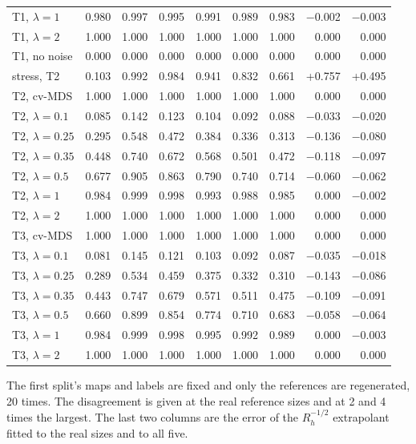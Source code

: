 \documentclass[11pt]{article}
\newcommand{\tablenote}[1]{\par\smallskip\noindent
  \begin{minipage}{\linewidth}\footnotesize\setlength{\parindent}{0pt}#1\end{minipage}}
\begin{document}
\begin{table}[!htb]
\begin{tabular}{lrrrrrrrr}
\quad T1, $\lambda=1$ & 0.980 & 0.997 & 0.995 & 0.991 & 0.989 & 0.983 & $-$0.002 & $-$0.003 \\
\quad T1, $\lambda=2$ & 1.000 & 1.000 & 1.000 & 1.000 & 1.000 & 1.000 & 0.000 & 0.000 \\
\quad T1, no noise & 0.000 & 0.000 & 0.000 & 0.000 & 0.000 & 0.000 & 0.000 & 0.000 \\
\quad stress, T2 & 0.103 & 0.992 & 0.984 & 0.941 & 0.832 & 0.661 & +0.757 & +0.495 \\
\quad T2, cv-MDS & 1.000 & 1.000 & 1.000 & 1.000 & 1.000 & 1.000 & 0.000 & 0.000 \\
\quad T2, $\lambda=0.1$ & 0.085 & 0.142 & 0.123 & 0.104 & 0.092 & 0.088 & $-$0.033 & $-$0.020 \\
\quad T2, $\lambda=0.25$ & 0.295 & 0.548 & 0.472 & 0.384 & 0.336 & 0.313 & $-$0.136 & $-$0.080 \\
\quad T2, $\lambda=0.35$ & 0.448 & 0.740 & 0.672 & 0.568 & 0.501 & 0.472 & $-$0.118 & $-$0.097 \\
\quad T2, $\lambda=0.5$ & 0.677 & 0.905 & 0.863 & 0.790 & 0.740 & 0.714 & $-$0.060 & $-$0.062 \\
\quad T2, $\lambda=1$ & 0.984 & 0.999 & 0.998 & 0.993 & 0.988 & 0.985 & 0.000 & $-$0.002 \\
\quad T2, $\lambda=2$ & 1.000 & 1.000 & 1.000 & 1.000 & 1.000 & 1.000 & 0.000 & 0.000 \\
\quad T3, cv-MDS & 1.000 & 1.000 & 1.000 & 1.000 & 1.000 & 1.000 & 0.000 & 0.000 \\
\quad T3, $\lambda=0.1$ & 0.081 & 0.145 & 0.121 & 0.103 & 0.092 & 0.087 & $-$0.035 & $-$0.018 \\
\quad T3, $\lambda=0.25$ & 0.289 & 0.534 & 0.459 & 0.375 & 0.332 & 0.310 & $-$0.143 & $-$0.086 \\
\quad T3, $\lambda=0.35$ & 0.443 & 0.747 & 0.679 & 0.571 & 0.511 & 0.475 & $-$0.109 & $-$0.091 \\
\quad T3, $\lambda=0.5$ & 0.660 & 0.899 & 0.854 & 0.774 & 0.710 & 0.683 & $-$0.058 & $-$0.064 \\
\quad T3, $\lambda=1$ & 0.984 & 0.999 & 0.998 & 0.995 & 0.992 & 0.989 & 0.000 & $-$0.003 \\
\quad T3, $\lambda=2$ & 1.000 & 1.000 & 1.000 & 1.000 & 1.000 & 1.000 & 0.000 & 0.000 \\
\bottomrule
\end{tabular}
\tablenote{The first split's maps and labels are fixed and only the references are regenerated, 20 times.
The disagreement is given at the real reference sizes and at 2 and 4 times the largest.
The last two columns are the error of the $R_h^{-1/2}$ extrapolant fitted to the real sizes and to all five.}
\end{table}
\end{document}
